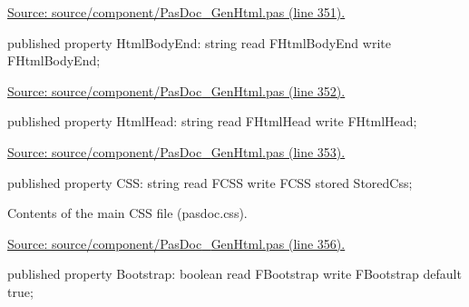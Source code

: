 \documentclass{report}
\newif\ifpdf
\begin{document}
\begin{list}{}
\begin{flushleft}
\ifpdf
\end{flushleft}
\fi


\par  \par
\href{https://github.com/pasdoc/pasdoc/blob/master/source/component/PasDoc_GenHtml.pas#L351}{Source: source/component/PasDoc{\_}GenHtml.pas (line 351).}\label{PasDoc_GenHtml.TGenericHTMLDocGenerator-HtmlBodyEnd}
\item[\textbf{HtmlBodyEnd}\hfill]
\ifpdf
\begin{flushleft}
\fi
\begin{ttfamily}
published property HtmlBodyEnd: string read FHtmlBodyEnd write FHtmlBodyEnd;\end{ttfamily}

\ifpdf
\end{flushleft}
\fi


\par  \par
\href{https://github.com/pasdoc/pasdoc/blob/master/source/component/PasDoc_GenHtml.pas#L352}{Source: source/component/PasDoc{\_}GenHtml.pas (line 352).}\label{PasDoc_GenHtml.TGenericHTMLDocGenerator-HtmlHead}
\item[\textbf{HtmlHead}\hfill]
\ifpdf
\begin{flushleft}
\fi
\begin{ttfamily}
published property HtmlHead: string read FHtmlHead write FHtmlHead;\end{ttfamily}

\ifpdf
\end{flushleft}
\fi


\par  \par
\href{https://github.com/pasdoc/pasdoc/blob/master/source/component/PasDoc_GenHtml.pas#L353}{Source: source/component/PasDoc{\_}GenHtml.pas (line 353).}\label{PasDoc_GenHtml.TGenericHTMLDocGenerator-CSS}
\item[\textbf{CSS}\hfill]
\ifpdf
\begin{flushleft}
\fi
\begin{ttfamily}
published property CSS: string read FCSS write FCSS stored StoredCss;\end{ttfamily}

\ifpdf
\end{flushleft}
\fi


\par Contents of the main CSS file (pasdoc.css).\par
\href{https://github.com/pasdoc/pasdoc/blob/master/source/component/PasDoc_GenHtml.pas#L356}{Source: source/component/PasDoc{\_}GenHtml.pas (line 356).}\label{PasDoc_GenHtml.TGenericHTMLDocGenerator-Bootstrap}
\item[\textbf{Bootstrap}\hfill]
\ifpdf
\begin{flushleft}
\fi
\begin{ttfamily}
published property Bootstrap: boolean read FBootstrap write FBootstrap default true;\end{ttfamily}


\end{flushleft}
\end{list}
\end{document}
